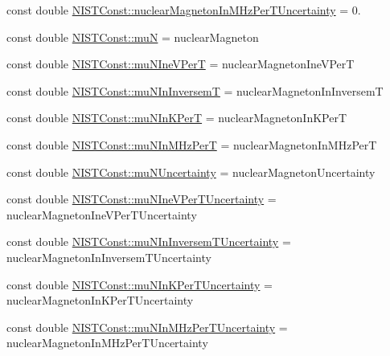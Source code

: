 \begin{DoxyCompactItemize}
\item 
const double \hyperlink{group___n_i_s_t_const-_nuclear_magneton_gafadaf7c2f76a76acf9313700c176b0a2}{N\+I\+S\+T\+Const\+::nuclear\+Magneton\+In\+M\+Hz\+Per\+T\+Uncertainty} = 0.
\item 
const double \hyperlink{group___n_i_s_t_const-_nuclear_magneton_ga5b19bcb311479cc6f5c36b551356e580}{N\+I\+S\+T\+Const\+::muN} = nuclear\+Magneton
\item 
const double \hyperlink{group___n_i_s_t_const-_nuclear_magneton_ga2c8a56a6542df06b37fed3b2b5444ff6}{N\+I\+S\+T\+Const\+::mu\+N\+Ine\+V\+PerT} = nuclear\+Magneton\+Ine\+V\+PerT
\item 
const double \hyperlink{group___n_i_s_t_const-_nuclear_magneton_ga9c4499c279614bf4bb837c9c4c74b208}{N\+I\+S\+T\+Const\+::mu\+N\+In\+InversemT} = nuclear\+Magneton\+In\+InversemT
\item 
const double \hyperlink{group___n_i_s_t_const-_nuclear_magneton_gaca6a801a34347be9fd04e7882187484c}{N\+I\+S\+T\+Const\+::mu\+N\+In\+K\+PerT} = nuclear\+Magneton\+In\+K\+PerT
\item 
const double \hyperlink{group___n_i_s_t_const-_nuclear_magneton_ga4c2e37b42112c282a0dc5969f351187e}{N\+I\+S\+T\+Const\+::mu\+N\+In\+M\+Hz\+PerT} = nuclear\+Magneton\+In\+M\+Hz\+PerT
\item 
const double \hyperlink{group___n_i_s_t_const-_nuclear_magneton_gabe781a9d8e34ad9a0901188db9784416}{N\+I\+S\+T\+Const\+::mu\+N\+Uncertainty} = nuclear\+Magneton\+Uncertainty
\item 
const double \hyperlink{group___n_i_s_t_const-_nuclear_magneton_ga9dc78b16dc28b0355f5b8c71b5d7f25c}{N\+I\+S\+T\+Const\+::mu\+N\+Ine\+V\+Per\+T\+Uncertainty} = nuclear\+Magneton\+Ine\+V\+Per\+T\+Uncertainty
\item 
const double \hyperlink{group___n_i_s_t_const-_nuclear_magneton_ga863b9f210eb86d33267fcb9b38b24082}{N\+I\+S\+T\+Const\+::mu\+N\+In\+Inversem\+T\+Uncertainty} = nuclear\+Magneton\+In\+Inversem\+T\+Uncertainty
\item 
const double \hyperlink{group___n_i_s_t_const-_nuclear_magneton_ga235e592dc664f715a256c4ee49410486}{N\+I\+S\+T\+Const\+::mu\+N\+In\+K\+Per\+T\+Uncertainty} = nuclear\+Magneton\+In\+K\+Per\+T\+Uncertainty
\item 
const double \hyperlink{group___n_i_s_t_const-_nuclear_magneton_ga5b70d81fc8665de09e33dc709a91e7f9}{N\+I\+S\+T\+Const\+::mu\+N\+In\+M\+Hz\+Per\+T\+Uncertainty} = nuclear\+Magneton\+In\+M\+Hz\+Per\+T\+Uncertainty
\end{DoxyCompactItemize}


